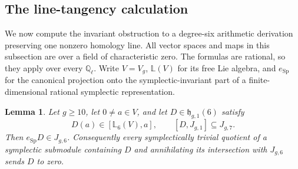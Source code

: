 \documentclass[11pt]{article}
\newtheorem{lemma}[theorem]{Lemma}
\theoremstyle{definition}\newtheorem{definition}[theorem]{Definition}
\begin{document}
\subsection{The line-tangency calculation}
\label{subsec:geometric-polynomial}

We now compute the invariant obstruction to a degree-six
arithmetic derivation preserving one nonzero homology line.
All vector spaces and maps in this subsection are over a
field of characteristic zero. The formulas are rational,
so they apply over every $\mathbb Q_\ell$.
Write $V=V_g$, $\mathbb L(V)$ for its free Lie algebra, and
$e_{\operatorname{Sp}}$ for the canonical projection onto
the symplectic-invariant part of a finite-dimensional
rational symplectic representation.

\begin{lemma}\label{lem:geometric-line-tangency}
Let $g\geq10$, let $0\ne a\in V$, and let
$D\in\mathfrak h_{g,1}(6)$ satisfy
\[
 D(a)\in[\mathbb L_6(V),a],\qquad [D,J_{g,1}]\subseteq J_{g,7}.
\]
Then $e_{\operatorname{Sp}}D\in J_{g,6}$.
Consequently every symplectically trivial quotient of a
symplectic submodule containing $D$ and annihilating its
intersection with $J_{g,6}$ sends $D$ to zero.
\end{lemma}
\end{document}
